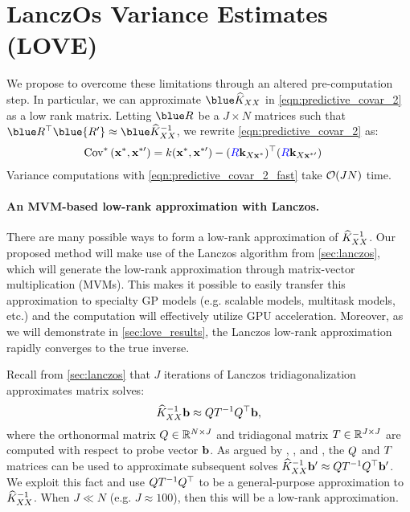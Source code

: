 \section{LanczOs Variance Estimates (LOVE)}
\label{sec:love_method}



We propose to overcome these limitations through an altered pre-computation step.
In particular, we can approximate $\blue \trainK$ in \eqref{eqn:predictive_covar_2} as a low rank matrix.
Letting $\blue \bR$ be a $J \times N$ matrices such that $\blue \bR^\top \blue{\bR'} \approx \blue \trainK^{-1}$, we rewrite \eqref{eqn:predictive_covar_2} as:
%
\begin{align}
  \text{Cov}^* \left( \mathbf{x}^*, \mathbf{x}^{*\prime} \right)
  &= k(\mathbf{x}^*, \mathbf{x}^{*\prime}) - ({\color{blue} R} \mathbf{k}_{X\mathbf{x}^*})^\top ({\color{blue} R} \mathbf{k}_{X\mathbf{x}^{*\prime}})
  \label{eqn:predictive_covar_2_fast}
\end{align}
%
Variance computations with \eqref{eqn:predictive_covar_2_fast} take $\bigo{JN}$ time.

\paragraph{An MVM-based low-rank approximation with Lanczos.}
There are many possible ways to form a low-rank approximation of $\widehat{K}_{XX}^{-1}$.
Our proposed method will make use of the Lanczos algorithm from \cref{sec:lanczos}, which will generate the low-rank approximation through matrix-vector multiplication (MVMs).
This makes it possible to easily transfer this approximation to specialty GP models (e.g. scalable models, multitask models, etc.) and the computation will effectively utilize GPU acceleration.
Moreover, as we will demonstrate in \cref{sec:love_results}, the Lanczos low-rank approximation rapidly converges to the true inverse.

Recall from \cref{sec:lanczos} that $J$ iterations of Lanczos tridiagonalization approximates matrix solves:
\[
  \widehat{K}_{XX}^{-1} \mathbf{b} \approx Q T^{-1} Q^{\top} \mathbf{b},
\]
where the orthonormal matrix $Q \in \mathbb{R}^{N \times J}$ and tridiagonal matrix $T \in \mathbb{R}^{J \times J}$ are computed with respect to probe vector $\mathbf{b}$.
As argued by \citet{parlett1980new}, \citet{saad1987lanczos}, and \citet{schneider2001krylov}, the $Q$ and $T$ matrices can be used to approximate subsequent solves
$\widehat{K}_{XX}^{-1} \mathbf{b}' \approx Q T^{-1} Q^\top \mathbf{b}'$.
We exploit this fact and use $Q T^{-1} Q^\top$ to be a general-purpose approximation to $\widehat{K}_{XX}^{-1}$.
When $J \ll N$ (e.g. $J \approx 100$), then this will be a low-rank approximation.

